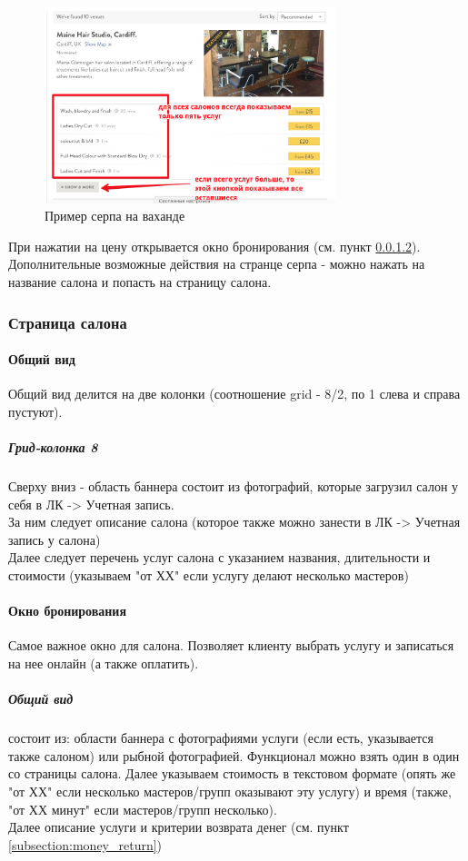 \documentclass[DIV=calc, paper=a4, fontsize=11pt]{scrartcl} %
\begin{document}
	 \begin{figure}[H]
        \centering
        \includegraphics[width=320px]{serp1.png}
        \caption{Пример серпа на ваханде\label{fig:serp.png}}
        \end{figure}
        
При нажатии на цену открывается окно бронирования (см. пункт \ref{paragraph:app_booking}).
Дополнительные возможные действия на странце серпа - можно нажать на название салона и попасть на страницу салона.

\subsubsection{Страница салона}

\paragraph{Общий вид}

Общий вид делится на две колонки (соотношение grid - 8/2, по 1 слева и справа пустуют).
\subparagraph{Грид-колонка 8}
Сверху вниз - область баннера состоит из фотографий, которые загрузил салон у себя в ЛК -> Учетная запись.
\\[0.5cm]
За ним следует описание салона (которое также можно занести в ЛК -> Учетная запись у салона)
\\[0.5cm]
Далее следует перечень услуг салона с указанием названия, длительности и стоимости (указываем "от ХХ" если услугу делают несколько мастеров)

\paragraph{Окно бронирования}\label{paragraph:app_booking}
Самое важное окно для салона. Позволяет клиенту выбрать услугу и записаться на нее онлайн (а также оплатить).

\subparagraph{Общий вид} состоит из: области баннера с фотографиями услуги (если есть, указывается также салоном) или рыбной фотографией. Функционал можно взять один в один со страницы салона. Далее указываем стоимость в текстовом формате (опять же "от ХХ" если несколько мастеров/групп оказывают эту услугу) и время (также, "от ХХ минут" если мастеров/групп несколько).
\\[0.5cm]
Далее описание услуги и критерии возврата денег (см. пункт \ref{subsection:money_return})
\end{document}
